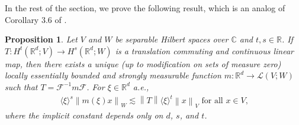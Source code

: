 \documentclass[11pt,letterpaper,reqno]{amsart}
\newtheorem{proposition}[theorem]{Proposition}
\numberwithin{equation}{section}
\newcommand{\norm}[1]{\left\lVert#1\right\rVert}
\begin{document}
In the rest of the section, we prove the following result, which is an analog of Corollary \(3.6\) of \cite{MR4787851}.
\begin{proposition} \label{fs}
    Let \(V\) and \(W\) be separable Hilbert spaces over \(\mathbb{C}\) and \(t,s \in \mathbb{R}\). If \(T: H^{t}(\mathbb{R}^{d};V) \to H^{s}(\mathbb{R}^{d};W)\) is a translation commuting and continuous linear map, then there exists a unique (up to modification on sets of measure zero) locally essentially bounded and strongly measurable function \(m: \mathbb{R}^{d} \to \mathcal{L}(V;W)\) such that \(T=\mathcal{F}^{-1}m\mathcal{F}\). For \(\xi \in \mathbb{R}^{d}\) a.e.,
    \begin{align}
        \langle \xi \rangle^{s}\norm{m(\xi)x}_{W} \lesssim \norm{T}\langle \xi\rangle^{t}\norm{x}_{V} \mbox{ for all \(x \in V\),}
    \end{align}
    where the implicit constant depends only on \(d\), \(s\), and \(t\).
\end{proposition}
\end{document}
